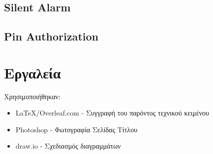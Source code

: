\documentclass{article}
\begin{document}
\subsection{Silent Alarm}
\noindent{}


\subsection{Pin Authorization}
\noindent{}


\section{Εργαλεία}
Χρησιμοποιήθηκαν:
\begin{itemize}
    \item \LaTeX/Overleaf.com - Συγγραφή του παρόντος τεχνικού κειμένου
    \item Photoshop - Φωτογραφία Σελίδας Τίτλου
    \item draw.io - Σχεδιασμός διαγραμμάτων
\end{itemize}
\end{document}

